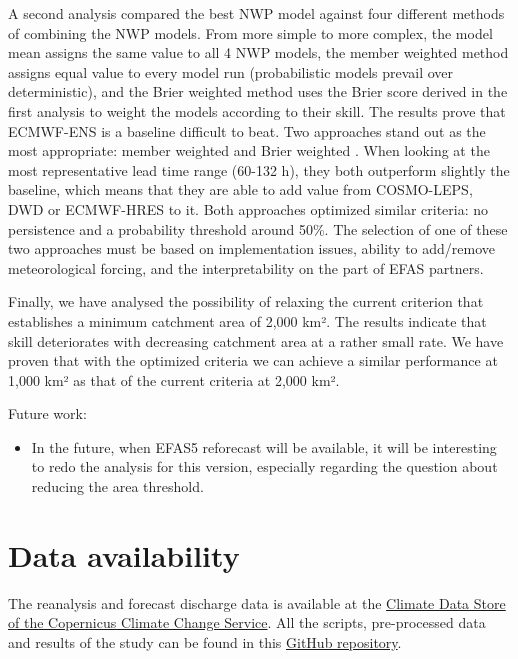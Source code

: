 \documentclass[preprint,12pt,authoryear]{elsarticle}
\begin{document}
A second analysis compared the best NWP model against four different methods of combining the NWP models. From more simple to more complex, the model mean assigns the same value to all 4 NWP models, the member weighted method assigns equal value to every model run (probabilistic models prevail over deterministic), and the Brier weighted method uses the Brier score derived in the first analysis to weight the models according to their skill. The results prove that ECMWF-ENS is a baseline difficult to beat. Two approaches stand out as the most appropriate: member weighted  and Brier weighted . When looking at the most representative lead time range (60-132 h), they both outperform slightly the baseline, which means that they are able to add value from COSMO-LEPS, DWD or ECMWF-HRES to it. Both approaches optimized similar criteria: no persistence and a probability threshold around 50\%. The selection of one of these two approaches must be based on implementation issues, ability to add/remove meteorological forcing, and the interpretability on the part of EFAS partners.

Finally, we have analysed the possibility of relaxing the current criterion that establishes a minimum catchment area of 2,000 km². The results indicate that skill deteriorates with decreasing catchment area at a rather small rate. We have proven that with the optimized criteria we can achieve a similar performance at 1,000 km² as that of the current criteria at 2,000 km². 

Future work:

\begin{itemize}
\item In the future, when EFAS5 reforecast will be available, it will be interesting to redo the analysis for this version, especially regarding the question about reducing the area threshold.
\end{itemize}

\section{Data availability}

The reanalysis and forecast discharge data is available at the \href{https://cds.climate.copernicus.eu}{Climate Data Store of the Copernicus Climate Change Service}. All the scripts, pre-processed data and results of the study can be found in this \href{https://github.com/casadoj/EFAS_skill}{GitHub repository}.

\appendix
\end{document}
